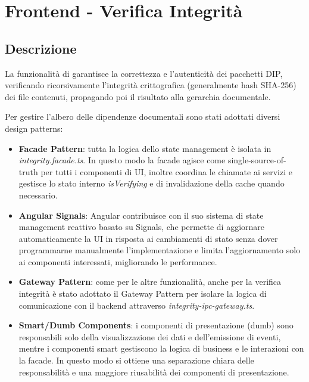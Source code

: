 \section{Frontend - Verifica Integrità}
\subsection{Descrizione}
La funzionalità di   garantisce la correttezza e l'autenticità dei pacchetti DIP, verificando ricorsivamente l'integrità crittografica (generalmente hash SHA-256) dei file contenuti, propagando poi il risultato alla gerarchia documentale.

Per gestire l'albero delle dipendenze documentali sono stati adottati diversi design patterns:
\begin{itemize}
    \item \textbf{Facade Pattern}: tutta la logica dello state management è isolata in \textit{integrity.facade.ts}. In questo modo la facade agisce come single-source-of-truth per tutti i componenti di UI, inoltre coordina le chiamate ai servizi e gestisce lo stato interno \textit{isVerifying} e di invalidazione della cache quando necessario.
    \item \textbf{Angular Signals}: Angular contribuisce con il suo sistema di state management reattivo basato su Signals, che permette di aggiornare automaticamente la UI in risposta ai cambiamenti di stato senza dover programmarne manualmente l'implementazione e limita l'aggiornamento solo ai componenti interessati, migliorando le performance.
    \item \textbf{Gateway Pattern}: come per le altre funzionalità, anche per la verifica integrità è stato adottato il Gateway Pattern per isolare la logica di comunicazione con il backend attraverso \textit{integrity-ipc-gateway.ts}.
    \item \textbf{Smart/Dumb Components}: i componenti di presentazione (dumb) sono responsabili solo della visualizzazione dei dati e dell'emissione di eventi, mentre i componenti smart gestiscono la logica di business e le interazioni con la facade. In questo modo si ottiene una separazione chiara delle responsabilità e una maggiore riusabilità dei componenti di presentazione.
\end{itemize}

